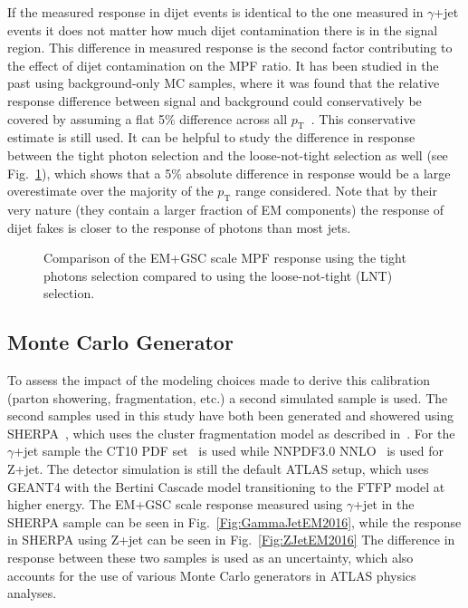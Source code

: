 If the measured response in dijet events is identical to the one measured in $\gamma$+jet events it does not matter how much dijet contamination there is in the signal region.  
This difference in measured response is the second factor contributing to the effect of dijet contamination on the MPF ratio.  
It has been studied in the past using background-only MC samples, where it was found that the relative response difference between signal and background could conservatively be covered by assuming a flat 5\% difference across all $p_{\mathrm T}$~\cite{ATLAS-CONF-2012-063}.  
This conservative estimate is still used.  
It can be helpful to study the difference in response between the tight photon selection and the loose-not-tight selection as well (see Fig.~\ref{fig:RespTightLNTEMGSC}), which shows that a 5\% absolute difference in response would be a large overestimate over the majority of the $p_{\mathrm T}$ range considered.  
Note that by their very nature (they contain a larger fraction of EM components) the response of dijet fakes is closer to the response of photons than most jets.   


\begin{figure}[!ht]
 \begin{center}
 \end{center}
 \caption[Response using tight photons compared to using loose-not-tight photons, EM+GSC scale]
 {\small Comparison of the EM+GSC scale MPF response using the tight photons selection compared to using the loose-not-tight (LNT) selection.  }
 \label{fig:RespTightLNTEMGSC}
\end{figure}

\subsection{Monte Carlo Generator}

To assess the impact of the modeling choices made to derive this calibration (parton showering, fragmentation, etc.) a second simulated sample is used.  
The second samples used in this study have both been generated and showered using {\sc SHERPA}~\cite{Gleisberg:2008ta}, which uses the cluster fragmentation model as described in~\cite{1983NuPhB.214..201G}.  
For the $\gamma$+jet sample the CT10 PDF set~\cite{Lai:2010vv} is used while NNPDF3.0 NNLO~\cite{Ball:2014uwa} is used for Z+jet.  
The detector simulation is still the default ATLAS setup, which uses GEANT4 with the Bertini Cascade model transitioning to the FTFP model at higher energy.   
The EM+GSC scale response measured using $\gamma$+jet in the {\sc SHERPA} sample can be seen in Fig.~\ref{Fig:GammaJetEM2016}, while the response in {\sc SHERPA} using Z+jet can be seen in Fig.~\ref{Fig:ZJetEM2016}
The difference in response between these two samples is used as an uncertainty, which also accounts for the use of various Monte Carlo generators in ATLAS physics analyses.  

